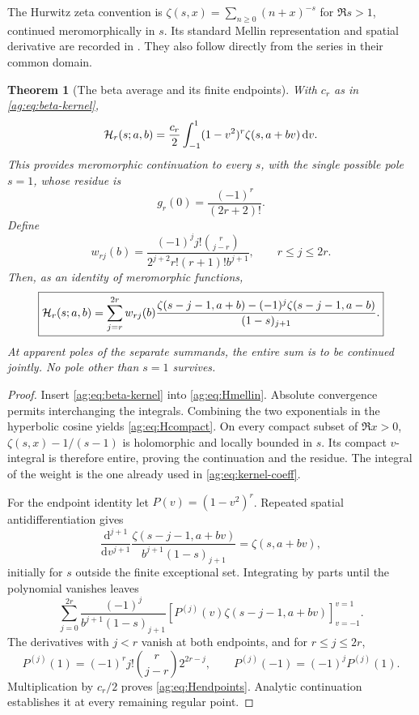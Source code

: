 \documentclass[11pt,letterpaper]{article}
\numberwithin{equation}{section}
\newtheorem{theorem}{Theorem}[section]
\theoremstyle{definition}\newtheorem{definition}[theorem]{Definition}
\theoremstyle{remark}\newtheorem{remark}[theorem]{Remark}
\newcommand{\dd}{\,\mathrm d}\newcommand{\ii}{\mathrm i}
\begin{document}
The Hurwitz zeta convention is
$\zeta(s,x)=\sum_{n\ge0}(n+x)^{-s}$ for $\Re s>1$, continued
meromorphically in $s$. Its standard Mellin representation and spatial
derivative are recorded in \cite{DLMFzeta}. They also follow directly
from the series in their common domain.

\begin{theorem}[The beta average and its finite endpoints]
\label{ag:thm:hurwitz}
With $c_r$ as in \eqref{ag:eq:beta-kernel},
\begin{equation}\label{ag:eq:Hcompact}
 \HH_r(s;a,b)=\frac{c_r}{2}\int_{-1}^1
                    (1-v^2)^r\zeta(s,a+bv)\dd v.
\end{equation}
This provides meromorphic continuation to every $s$, with the single
possible pole $s=1$, whose residue is
\begin{equation}\label{ag:eq:Hresidue}
 g_r(0)=\frac{(-1)^r}{(2r+2)!}.
\end{equation}
Define
\begin{equation}\label{ag:eq:weights}
 w_{rj}(b)=\frac{(-1)^j j!\binom r{j-r}}
 {2^{j+2}r!(r+1)!b^{j+1}},\qquad r\le j\le2r.
\end{equation}
Then, as an identity of meromorphic functions,
\begin{equation}\label{ag:eq:Hendpoints}
 \boxed{
 \mathcal H_r(s;a,b)=\sum_{j=r}^{2r}w_{rj}(b)
 \frac{\zeta(s-j-1,a+b)-(-1)^j\zeta(s-j-1,a-b)}{(1-s)_{j+1}}.}
\end{equation}
At apparent poles of the separate summands, the entire sum is to be
continued jointly. No pole other than $s=1$ survives.
\end{theorem}
\begin{proof}
Insert \eqref{ag:eq:beta-kernel} into \eqref{ag:eq:Hmellin}.
Absolute convergence permits interchanging the integrals. Combining
the two exponentials in the hyperbolic cosine yields
\eqref{ag:eq:Hcompact}. On every compact subset of $\Re x>0$,
$\zeta(s,x)-1/(s-1)$ is holomorphic and locally bounded in $s$.
Its compact $v$-integral is therefore entire, proving the continuation
and the residue. The integral of the weight is the one already used
in \eqref{ag:eq:kernel-coeff}.

For the endpoint identity let $P(v)=(1-v^2)^r$. Repeated spatial
antidifferentiation gives
\[
 \frac{\mathrm d^{j+1}}{\mathrm dv^{j+1}}
 \frac{\zeta(s-j-1,a+bv)}{b^{j+1}(1-s)_{j+1}}
 =\zeta(s,a+bv),
\]
initially for $s$ outside the finite exceptional set. Integrating by
parts until the polynomial vanishes leaves
\[
 \sum_{j=0}^{2r}\frac{(-1)^j}{b^{j+1}(1-s)_{j+1}}
       [P^{(j)}(v)\zeta(s-j-1,a+bv)]_{v=-1}^{v=1}.
\]
The derivatives with $j<r$ vanish at both endpoints, and for $r\le j\le2r$,
\begin{equation}\label{ag:eq:weight-derivative}
 P^{(j)}(1)=(-1)^r j!\binom r{j-r}2^{2r-j},\qquad
 P^{(j)}(-1)=(-1)^jP^{(j)}(1).
\end{equation}
Multiplication by $c_r/2$ proves \eqref{ag:eq:Hendpoints}. Analytic
continuation establishes it at every remaining regular point.
\end{proof}
\end{document}
